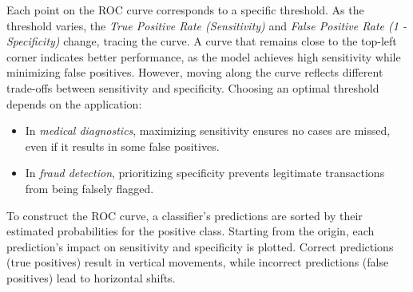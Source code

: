 \documentclass[
  11pt,
]{book}
\providecommand{\tightlist}{%
  \setlength{\itemsep}{0pt}\setlength{\parskip}{0pt}}
\theoremstyle{definition}
\theoremstyle{definition}
\theoremstyle{definition}
\theoremstyle{definition}
\theoremstyle{remark}
\begin{document}
Each point on the ROC curve corresponds to a specific threshold. As the threshold varies, the \emph{True Positive Rate (Sensitivity)} and \emph{False Positive Rate (1 - Specificity)} change, tracing the curve. A curve that remains close to the top-left corner indicates better performance, as the model achieves high sensitivity while minimizing false positives. However, moving along the curve reflects different trade-offs between sensitivity and specificity. Choosing an optimal threshold depends on the application:

\begin{itemize}
\tightlist
\item
  In \emph{medical diagnostics}, maximizing sensitivity ensures no cases are missed, even if it results in some false positives.\\
\item
  In \emph{fraud detection}, prioritizing specificity prevents legitimate transactions from being falsely flagged.
\end{itemize}

To construct the ROC curve, a classifier's predictions are sorted by their estimated probabilities for the positive class. Starting from the origin, each prediction's impact on sensitivity and specificity is plotted. Correct predictions (true positives) result in vertical movements, while incorrect predictions (false positives) lead to horizontal shifts.
\end{document}

